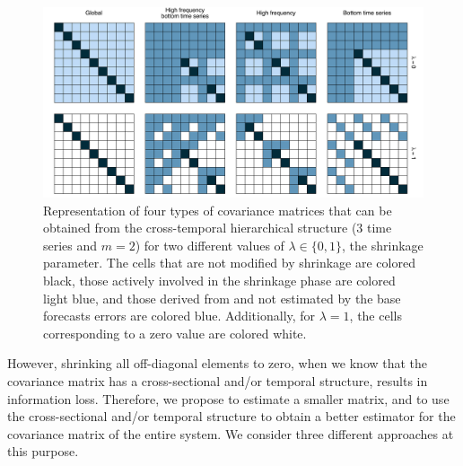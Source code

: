 \documentclass[a4paper,11pt]{article}
\theoremstyle{definition}
\begin{document}
\begin{figure}[!h]
	\centering
	\includegraphics[width = \linewidth]{fig/shr_cov/shr_color.pdf}
	\caption{Representation of four types of covariance matrices that can be obtained from the cross-temporal hierarchical structure ($3$ time series and $m = 2$) for two different values of $\lambda\in\{0,1\}$, the shrinkage parameter. The cells that are not modified by shrinkage are colored black, those actively involved in the shrinkage phase are colored light blue, and those derived from and not estimated by the base forecasts errors are colored blue. Additionally, for $\lambda = 1$, the cells corresponding to a zero value are colored white.}
	\label{fig:shr_grid}
\end{figure}

However, shrinking all off-diagonal elements to zero, when we know that the covariance matrix has a cross-sectional and/or temporal structure, results in information loss. Therefore, we propose to estimate a smaller matrix, and to use the cross-sectional and/or temporal structure to obtain a better estimator for the covariance matrix of the entire system. We consider three different approaches at this purpose.
\end{document}
